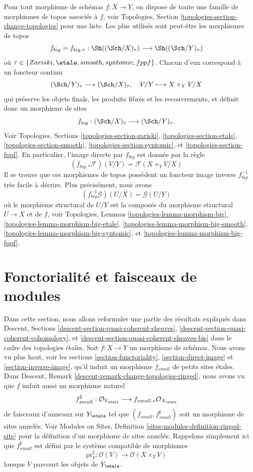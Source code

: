 \noindent
Pour tout morphisme de sch\'emas $f : X \to Y$, on dispose de toute une famille de
morphismes de topos associ\'es \`a $f$, voir
Topologies, Section \ref{topologies-section-change-topologies}
pour une liste. Les plus utilis\'es sont peut-\^etre les morphismes de topos
$$
f_{big} = f_{big, \tau} :
\Sh((\Sch/X)_\tau)
\longrightarrow
\Sh((\Sch/Y)_\tau)
$$
o\`u $\tau \in \{Zariski, \etale, smooth, syntomic, fppf\}$.
Chacun d'eux correspond \`a un foncteur continu
$$
(\Sch/Y)_\tau \longrightarrow (\Sch/X)_\tau, \quad
V/Y \longmapsto X \times_Y V/X
$$
qui pr\'eserve les objets finals, les produits fibr\'es et les recouvrements, et d\'efinit donc
un morphisme de sites
$$
f_{big} : (\Sch/X)_\tau \longrightarrow (\Sch/Y)_\tau.
$$
Voir
Topologies, Sections \ref{topologies-section-zariski},
\ref{topologies-section-etale},
\ref{topologies-section-smooth},
\ref{topologies-section-syntomic}, et
\ref{topologies-section-fppf}.
En particulier, l'image directe par $f_{big}$ est donn\'ee par la r\`egle
$$
(f_{big, *}\mathcal{F})(V/Y) = \mathcal{F}(X \times_Y V/X)
$$
Il se trouve que ces morphismes de topos poss\`edent un foncteur image
inverse $f_{big}^{-1}$ tr\`es facile \`a d\'ecrire.
Plus pr\'ecis\'ement, nous avons
$$
(f_{big}^{-1}\mathcal{G})(U/X) = \mathcal{G}(U/Y)
$$
o\`u le morphisme structural de $U/Y$ est la compos\'ee du
morphisme structural $U \to X$ et de $f$, voir
Topologies, Lemmas \ref{topologies-lemma-morphism-big},
\ref{topologies-lemma-morphism-big-etale},
\ref{topologies-lemma-morphism-big-smooth},
\ref{topologies-lemma-morphism-big-syntomic}, et
\ref{topologies-lemma-morphism-big-fppf}.







\section{Fonctorialit\'e et faisceaux de modules}
\label{section-morphisms-modules}

\noindent
Dans cette section, nous allons reformuler une partie des r\'esultats expliqu\'es dans
Descent, Sections \ref{descent-section-quasi-coherent-sheaves},
\ref{descent-section-quasi-coherent-cohomology}, et
\ref{descent-section-quasi-coherent-sheaves-bis}
dans le cadre des topologies \'etales. Soit $f : X \to Y$ un morphisme de
sch\'emas. Nous avons vu plus haut, voir les
sections \ref{section-functoriality}, \ref{section-direct-image} et
\ref{section-inverse-image},
qu'il induit un morphisme $f_{small}$ de petits sites \'etales. Dans
Descent, Remark \ref{descent-remark-change-topologies-ringed},
nous avons vu que $f$ induit aussi un morphisme naturel
$$
f_{small}^\sharp :
\mathcal{O}_{Y_\etale}
\longrightarrow
f_{small, *}\mathcal{O}_{X_\etale}
$$
de faisceaux d'anneaux sur
$Y_\etale$ tel que $(f_{small}, f_{small}^\sharp)$
soit un morphisme de sites annel\'es. Voir
Modules on Sites, Definition \ref{sites-modules-definition-ringed-site}
pour la d\'efinition d'un morphisme de sites annel\'es.
Rappelons simplement ici que $f_{small}^\sharp$ est d\'efini par le
syst\`eme compatible de morphismes
$$
\text{pr}_V^\sharp : \mathcal{O}(V) \longrightarrow \mathcal{O}(X \times_Y V)
$$
lorsque $V$ parcourt les objets de $Y_\etale$.

